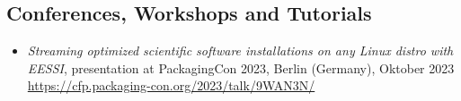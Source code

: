 \subsection*{Conferences, Workshops and Tutorials}

\begin{itemize}

\item[] \emph{Streaming optimized scientific software installations on any Linux distro with EESSI}, presentation at PackagingCon 2023, 
    Berlin (Germany), Oktober 2023 {\small{\url{https://cfp.packaging-con.org/2023/talk/9WAN3N/}}}
\end{itemize}
